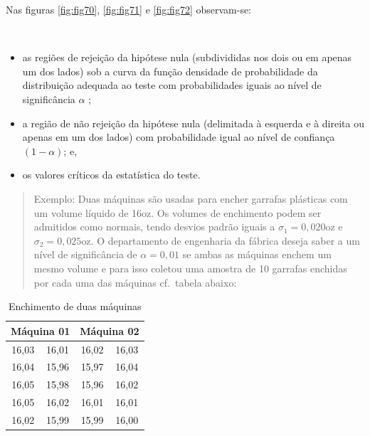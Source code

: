 \documentclass[
]{book}
\providecommand{\tightlist}{%
  \setlength{\itemsep}{0pt}\setlength{\parskip}{0pt}}
\begin{document}
\hfill\break

Nas figuras \ref{fig:fig70}, \ref{fig:fig71} e \ref{fig:fig72} observam-se:

~

\begin{itemize}
\tightlist
\item
  as regiões de rejeição da hipótese nula (subdivididas nos dois ou em apenas um dos lados) sob a curva da função densidade de probabilidade da distribuição adequada ao teste com probabilidades iguais ao nível de significância \(\alpha\) ;\\
\item
  a região de não rejeição da hipótese nula (delimitada à esquerda e à direita ou apenas em um dos lados) com probabilidade igual ao nível de confiança \((1-\alpha)\); e,\\
\item
  os valores críticos da estatística do teste.
\end{itemize}

\hfill\break

\begin{quote}
Exemplo: Duas máquinas são usadas para encher garrafas plásticas com um volume líquido de 16oz. Os volumes de enchimento podem ser admitidos como normais, tendo desvios padrão iguais a \(\sigma_{1}=0,020\)oz e \(\sigma_{2}=0,025\)oz. O departamento de engenharia da fábrica deseja saber a um nível de significância de \(\alpha=0,01\) se ambas as máquinas enchem um mesmo volume e para isso coletou uma amostra de 10 garrafas enchidas por cada uma das máquinas cf.~tabela abaixo:
\end{quote}

\hfill\break

\begin{table}[h]
\centering
\caption{Enchimento de duas máquinas}   
\begin{tabular}{|c|c|c|c|}
\hline 
\multicolumn{2}{|c|}{Máquina 01} & \multicolumn{2}{|c|}{Máquina 02}   \\ 
\hline 
16,03 & 16,01 & 16,02 & 16,03 \\ 
\hline 
16,04 & 15,96 & 15,97 & 16,04 \\ 
\hline 
16,05 & 15,98 & 15,96 & 16,02 \\ 
\hline 
16,05 & 16,02 & 16,01 & 16,01 \\ 
\hline 
16,02 & 15,99 & 15,99 & 16,00 \\ 
\hline 
\end{tabular}  
\end{table}
\end{document}
